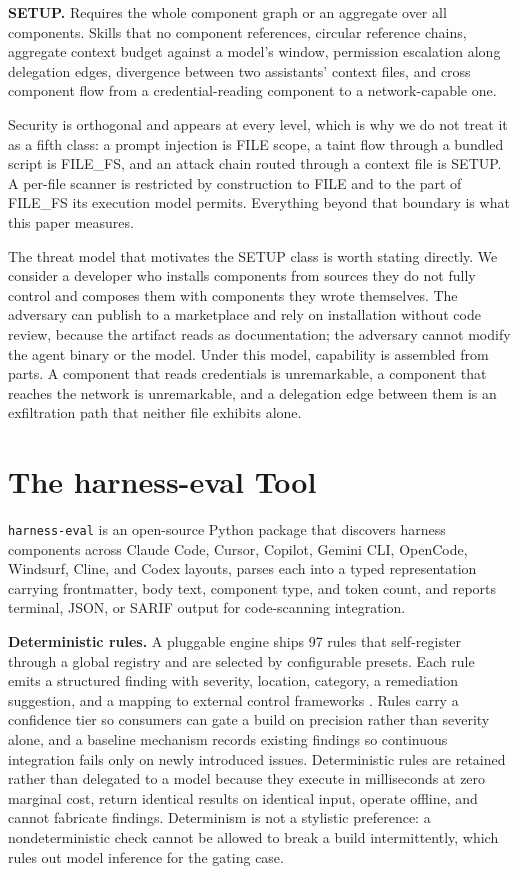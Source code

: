 \documentclass[conference]{IEEEtran}
\begin{document}
\textbf{SETUP.} Requires the whole component graph or an aggregate over all
components. Skills that no component references, circular reference chains,
aggregate context budget against a model's window, permission escalation along
delegation edges, divergence between two assistants' context files, and cross
component flow from a credential-reading component to a network-capable one.

Security is orthogonal and appears at every level, which is why we do not treat
it as a fifth class: a prompt injection is FILE scope, a taint flow through a
bundled script is FILE\_FS, and an attack chain routed through a context file is
SETUP. A per-file scanner is restricted by construction to FILE and to the part
of FILE\_FS its execution model permits. Everything beyond that boundary is what
this paper measures.

The threat model that motivates the SETUP class is worth stating directly. We
consider a developer who installs components from sources they do not fully
control and composes them with components they wrote themselves. The adversary
can publish to a marketplace and rely on installation without code review,
because the artifact reads as documentation; the adversary cannot modify the
agent binary or the model. Under this model, capability is assembled from parts.
A component that reads credentials is unremarkable, a component that reaches the
network is unremarkable, and a delegation edge between them is an exfiltration
path that neither file exhibits alone.

\section{The harness-eval Tool}
\label{sec:tool}

\texttt{harness-eval} is an open-source Python package that discovers harness
components across Claude Code, Cursor, Copilot, Gemini CLI, OpenCode, Windsurf,
Cline, and Codex layouts, parses each into a typed representation carrying
frontmatter, body text, component type, and token count, and reports terminal,
JSON, or SARIF output for code-scanning integration.

\textbf{Deterministic rules.} A pluggable engine ships 97 rules that
self-register through a global registry and are selected by configurable
presets. Each rule emits a structured finding with severity, location, category,
a remediation suggestion, and a mapping to external control frameworks
\cite{owaspllm, mitreatlas}. Rules carry a confidence tier so consumers can gate
a build on precision rather than severity alone, and a baseline mechanism
records existing findings so continuous integration fails only on newly
introduced issues. Deterministic rules are retained rather than delegated to a
model because they execute in milliseconds at zero marginal cost, return
identical results on identical input, operate offline, and cannot fabricate
findings. Determinism is not a stylistic preference: a nondeterministic check
cannot be allowed to break a build intermittently, which rules out model
inference for the gating case.
\end{document}
